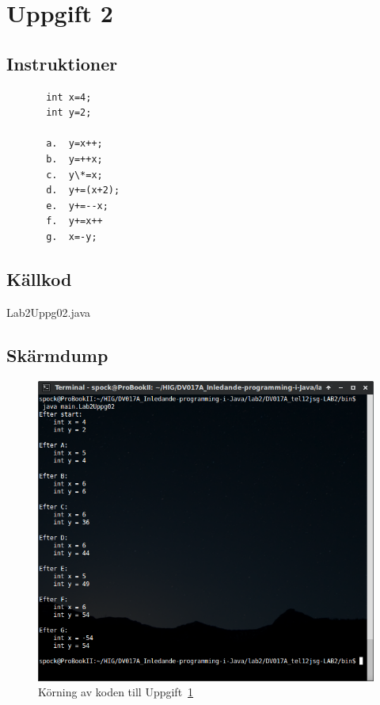 \section{Uppgift 2}\label{sec:uppg02}

\subsection{Instruktioner}

\begin{verbatim}
       int x=4;
       int y=2;

       a.  y=x++;
       b.  y=++x;
       c.  y\*=x;
       d.  y+=(x+2);
       e.  y+=--x;
       f.  y+=x++
       g.  x=-y;
\end{verbatim}


%


\subsection{Källkod}
\caption{Lab2Uppg02.java}
\label{src:uppg02}


\subsection{Skärmdump}
\begin{figure}[htbp]
    \centering
        \includegraphics[width=\linewidth]{img/02.png}
    \caption{Körning av koden till Uppgift~\ref{sec:uppg02}}
\label{fig:uppg02-screenshot}
\end{figure}

